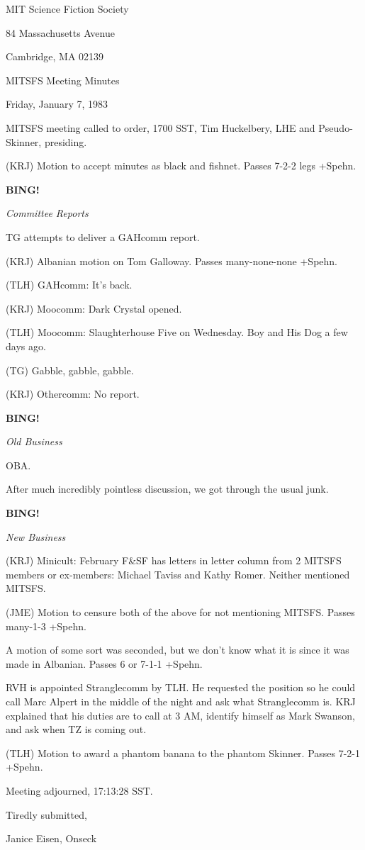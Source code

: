 \documentclass[12pt]{article}
\newcommand{\bing}{{\bf BING!} }
\newcommand{\goto}[1]{\bing \vskip 12pt \centerline{{\em{#1}}}}
\begin{document}
\begin{center}

MIT Science Fiction Society 

84 Massachusetts Avenue

Cambridge, MA 02139

\vspace{12pt}

MITSFS Meeting Minutes 

Friday, January 7, 1983

\end{center}
 
\vspace{18pt}

\setlength{\parskip}{6pt}

\noindent
MITSFS meeting called to order, 1700 SST,
Tim Huckelbery, LHE and Pseudo-Skinner, presiding.

(KRJ) Motion to accept minutes as black and fishnet. Passes 7-2-2 legs +Spehn.

\goto{Committee Reports}

TG attempts to deliver a GAHcomm report.

(KRJ) Albanian motion on Tom Galloway. Passes many-none-none +Spehn.

(TLH) GAHcomm: It's back.

(KRJ) Moocomm: Dark Crystal opened.

(TLH) Moocomm: Slaughterhouse Five on Wednesday. Boy and His Dog a few days ago.

(TG) Gabble, gabble, gabble.

(KRJ) Othercomm: No report.

\goto{Old Business}

OBA.

After much incredibly pointless discussion, we got through the usual junk.

\goto{New Business}

(KRJ) Minicult: February F&SF has letters in letter column from 2 MITSFS members or ex-members: Michael Taviss and Kathy Romer. Neither mentioned MITSFS.

(JME) Motion to censure both of the above for not mentioning MITSFS. Passes many-1-3 +Spehn.

A motion of some sort was seconded, but we don't know what it is since it was made in Albanian. Passes 6 or 7-1-1 +Spehn.

RVH is appointed Stranglecomm by TLH. He requested the position so he could call Marc Alpert in the middle of the night and ask what Stranglecomm is. KRJ explained that his duties are to call at 3 AM, identify himself as Mark Swanson, and ask when TZ is coming out.

(TLH) Motion to award a phantom banana to the phantom Skinner. Passes 7-2-1 +Spehn.

\vspace{12pt}

\noindent
Meeting adjourned, 17:13:28 SST.

\vspace{18pt}

\centerline{Tiredly submitted,}
\centerline{Janice Eisen, Onseck}
\end{document}
